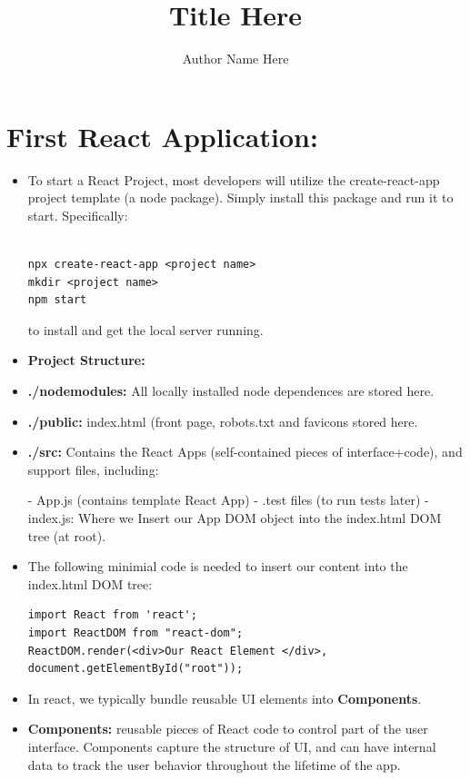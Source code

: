 \documentclass[8pt,a4paper]{extarticle}
\title{Title Here}
\author{Author Name Here}
\begin{document}
\newcommand{\mitem}{\item[$\square$]}
\newcommand{\mmitem}{\item[$\triangledown$]}

\maketitle


\section*{First React Application:}

\begin{itemize}
\item To start a React Project, most developers will utilize the create-react-app project template (a node package). Simply install this package and run it to start.
Specifically:

\begin{verbatim}

npx create-react-app <project name>
mkdir <project name>
npm start

\end{verbatim}

to install and get the local server running.

\item \textbf{Project Structure:}
\item \textbf{./nodemodules:} All locally installed node dependences are stored here.
\item \textbf{./public:} index.html (front page, robots.txt and favicons stored here.
\item \textbf{./src:} Contains the React Apps (self-contained pieces of interface+code), and support files, including:

- App.js (contains template React App)
- .test files (to run tests later)
- index.js: Where we Insert our App DOM object into the index.html DOM tree (at root).

\item The following minimial code is needed to insert our content into the index.html DOM tree:

\begin{verbatim}
import React from 'react';
import ReactDOM from "react-dom";
ReactDOM.render(<div>Our React Element </div>, 
document.getElementById("root"));
\end{verbatim}

\item In react, we typically bundle reusable UI elements into \textbf{Components}. 
\item \textbf{Components:} reusable pieces of React code to control part of the user interface. Components capture the structure of UI, and can have internal data to track the user behavior throughout the lifetime of the app.


\end{itemize}
\end{document}
